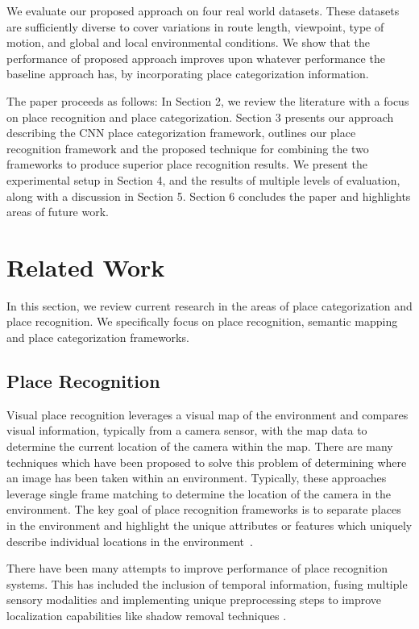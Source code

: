 \documentclass[letterpaper, 10 pt, conference]{ieeeconf}  %
\begin{document}
We evaluate our proposed approach on four real world datasets. These datasets are sufficiently diverse to cover variations in route length, viewpoint, type of motion, and global and local environmental conditions. We show that the performance of proposed approach improves upon whatever performance the baseline approach has, by incorporating place categorization information. 

The paper proceeds as follows: In Section 2, we review the literature with a focus on place recognition and place categorization. Section 3 presents our approach describing the CNN place categorization framework, outlines our place recognition framework and the proposed technique for combining the two frameworks to produce superior place recognition results. We present the experimental setup in Section 4, and the results of multiple levels of evaluation, along with a discussion in Section 5. Section 6 concludes the paper and highlights areas of future work.

\section{Related Work}
In this section, we review current research in the areas of place categorization and place recognition. We specifically focus on place recognition, semantic mapping and place categorization frameworks. 

\subsection{Place Recognition}
Visual place recognition leverages a visual map of the environment and compares visual information, typically from a camera sensor, with the map data to determine the current location of the camera within the map. There are many techniques which have been proposed to solve this problem of determining where an image has been taken within an environment. Typically, these approaches leverage single frame matching to determine the location of the camera in the environment. The key goal of place recognition frameworks is to separate places in the environment and highlight the unique attributes or features which uniquely describe individual locations in the environment~\cite{Cummins2009}. 

There have been many attempts to improve performance of place recognition systems. This has included the inclusion of temporal information, fusing multiple sensory modalities and implementing unique preprocessing steps to improve localization capabilities like shadow removal techniques \cite{corke2013dealing}. 
\end{document}
